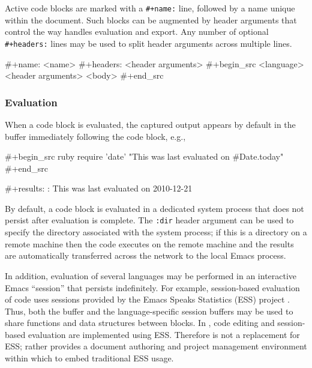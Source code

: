 \documentclass[article,shortnames]{jss}
\begin{document}
Active code blocks are marked with a \texttt{\#+name:} line, followed by a
name unique within the document.  Such blocks can be augmented by
header arguments that control the way  handles evaluation and
export.  Any number of optional \texttt{\#+headers:} lines may be used to
split header arguments across multiple lines.

\begin{Code}
#+name: <name>
#+headers: <header arguments>
#+begin_src <language> <header arguments>
  <body>
#+end_src
\end{Code}
\subsubsection{Evaluation}
\label{sec-3-2-2}


When a code block is evaluated, the captured output appears by default
in the  buffer immediately following the code block, e.g.,

\begin{Code}
#+begin_src ruby
  require 'date'
  "This was last evaluated on #{Date.today}"
#+end_src

#+results:
: This was last evaluated on 2010-12-21
\end{Code}







By default, a code block is evaluated in a dedicated system process
that does not persist after evaluation is complete. The \texttt{:dir} header
argument can be used to specify the directory associated with the
system process; if this is a directory on a remote machine then the
code executes on the remote machine and the results are automatically
transferred across the network to the local Emacs process.

In addition, evaluation of several languages may be performed in an
interactive Emacs ``session'' that persists indefinitely. For example,
session-based evaluation of  code uses  sessions provided by the
Emacs Speaks Statistics (ESS) project \citep{ess}.  Thus, both the 
buffer and the language-specific session buffers may be used to
share functions and data structures between blocks. In ,
 code editing and session-based  evaluation are implemented using
ESS. Therefore  is not a replacement for ESS; rather 
provides a document authoring and project management environment
within which to embed traditional ESS usage.
\end{document}
